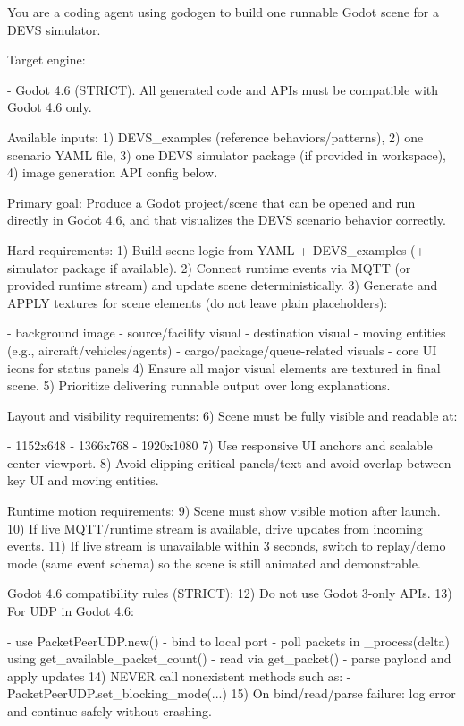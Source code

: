 \begin{promptbox}
You are a coding agent using godogen to build one runnable Godot scene for a DEVS simulator.

Target engine:

- Godot 4.6 (STRICT). All generated code and APIs must be compatible with Godot 4.6 only.

Available inputs:
1) DEVS_examples (reference behaviors/patterns),
2) one scenario YAML file,
3) one DEVS simulator package (if provided in workspace),
4) image generation API config below.

Primary goal:
Produce a Godot project/scene that can be opened and run directly in Godot 4.6, and that visualizes the DEVS scenario behavior correctly.

Hard requirements:
1) Build scene logic from YAML + DEVS_examples (+ simulator package if available).
2) Connect runtime events via MQTT (or provided runtime stream) and update scene deterministically.
3) Generate and APPLY textures for scene elements (do not leave plain placeholders):

   - background image
   - source/facility visual
   - destination visual
   - moving entities (e.g., aircraft/vehicles/agents)
   - cargo/package/queue-related visuals
   - core UI icons for status panels
     4) Ensure all major visual elements are textured in final scene.
     5) Prioritize delivering runnable output over long explanations.

Layout and visibility requirements:
6) Scene must be fully visible and readable at:

   - 1152x648
   - 1366x768
   - 1920x1080
     7) Use responsive UI anchors and scalable center viewport.
     8) Avoid clipping critical panels/text and avoid overlap between key UI and moving entities.

Runtime motion requirements:
9) Scene must show visible motion after launch.
10) If live MQTT/runtime stream is available, drive updates from incoming events.
11) If live stream is unavailable within 3 seconds, switch to replay/demo mode (same event schema) so the scene is still animated and demonstrable.

Godot 4.6 compatibility rules (STRICT):
12) Do not use Godot 3-only APIs.
13) For UDP in Godot 4.6:

   - use PacketPeerUDP.new()
   - bind to local port
   - poll packets in _process(delta) using get_available_packet_count()
   - read via get_packet()
   - parse payload and apply updates
     14) NEVER call nonexistent methods such as:
   - PacketPeerUDP.set_blocking_mode(...)
     15) On bind/read/parse failure: log error and continue safely without crashing.


\end{promptbox}
